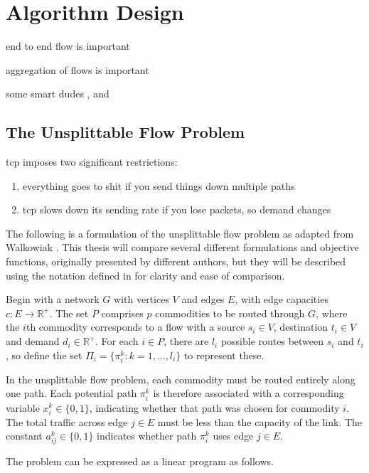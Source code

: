 \chapter{Algorithm Design}

end to end flow is important

aggregation of flows is important

some smart dudes \cite{bonsma:ufp}, \cite{anag:mazing} and \cite{chakrabarti:ufp}

\section{The Unsplittable Flow Problem}
tcp imposes two significant restrictions:

\begin{enumerate}
	\item everything goes to shit if you send things down multiple paths
	\item tcp slows down its sending rate if you lose packets, so demand changes
\end{enumerate}

The following is a formulation of the unsplittable flow problem as adapted from Walkowiak \cite{walkowiak:residual}. This thesis will compare several different formulations and objective functions, originally presented by different authors, but they will be described using the notation defined in \cite{walkowiak:residual} for clarity and ease of comparison.

Begin with a network $G$ with vertices $V$ and edges $E$, with edge capacities $c : E \rightarrow \mathbb{R}^+$. The set $P$ comprises $p$ commodities to be routed through $G$, where the $i$th commodity corresponds to a flow with a source $s_i \in V$, destination $t_i \in V$ and demand $d_i \in \mathbb{R}^+$. For each $i \in P$, there are $l_i$ possible routes between $s_i$ and $t_i$, so define the set $\Pi_i = \{\pi_i^k : k = 1, ..., l_i\}$ to represent these.

In the unsplittable flow problem, each commodity must be routed entirely along one path. Each potential path $\pi_i^k$ is therefore associated with a corresponding variable $x_i^k \in \{0,1\}$, indicating whether that path was chosen for commodity $i$. The total traffic across edge $j \in E$ must be less than the capacity of the link. The constant $a_{ij}^k \in \{0,1\}$ indicates whether path $\pi_i^k$ uses edge $j \in E$.

The problem can be expressed as a linear program as follows.

